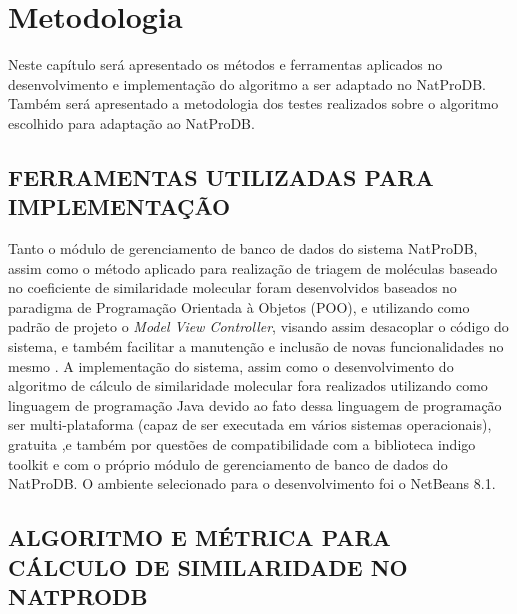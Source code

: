 
\chapter{Metodologia}
\label{chap:metodo}
Neste capítulo será apresentado os métodos e ferramentas aplicados no
desenvolvimento e implementação do algoritmo a ser adaptado no NatProDB. Também será
apresentado a metodologia dos testes realizados sobre o algoritmo escolhido para adaptação ao
NatProDB.

\section{FERRAMENTAS UTILIZADAS PARA IMPLEMENTAÇÃO}

Tanto o módulo de gerenciamento de banco de dados do sistema NatProDB, assim como o método aplicado para  realização de triagem de moléculas baseado no coeficiente de similaridade molecular foram desenvolvidos baseados no paradigma de Programação Orientada à Objetos (POO), e utilizando como padrão de projeto o \textit{Model View Controller}, visando assim desacoplar o código do sistema, e também facilitar a manutenção e inclusão de novas funcionalidades no mesmo \cite{patterns2003model}. A implementação do sistema, assim como o desenvolvimento do algoritmo de cálculo de similaridade molecular fora realizados utilizando como linguagem de programação Java devido ao fato dessa linguagem de programação ser multi-plataforma (capaz de ser executada em vários sistemas operacionais),  gratuita ,e também por questões de compatibilidade com a biblioteca indigo toolkit e com o próprio módulo de gerenciamento de banco de dados do NatProDB. O ambiente selecionado para o desenvolvimento foi o NetBeans 8.1.

\section{ALGORITMO E MÉTRICA PARA CÁLCULO DE SIMILARIDADE NO NATPRODB}

